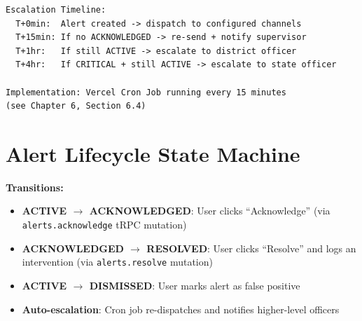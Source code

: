 \documentclass[12pt,a4paper]{report}
\begin{document}
\begin{lstlisting}[caption={Escalation timeline}]
Escalation Timeline:
  T+0min:  Alert created -> dispatch to configured channels
  T+15min: If no ACKNOWLEDGED -> re-send + notify supervisor
  T+1hr:   If still ACTIVE -> escalate to district officer
  T+4hr:   If CRITICAL + still ACTIVE -> escalate to state officer

Implementation: Vercel Cron Job running every 15 minutes
(see Chapter 6, Section 6.4)
\end{lstlisting}

\section{Alert Lifecycle State Machine}

\begin{center}
\end{center}

\textbf{Transitions:}
\begin{itemize}[nosep]
  \item \textbf{ACTIVE $\rightarrow$ ACKNOWLEDGED}: User clicks ``Acknowledge'' (via \texttt{alerts.acknowledge} tRPC mutation)
  \item \textbf{ACKNOWLEDGED $\rightarrow$ RESOLVED}: User clicks ``Resolve'' and logs an intervention (via \texttt{alerts.resolve} mutation)
  \item \textbf{ACTIVE $\rightarrow$ DISMISSED}: User marks alert as false positive
  \item \textbf{Auto-escalation}: Cron job re-dispatches and notifies higher-level officers
\end{itemize}
\end{document}
